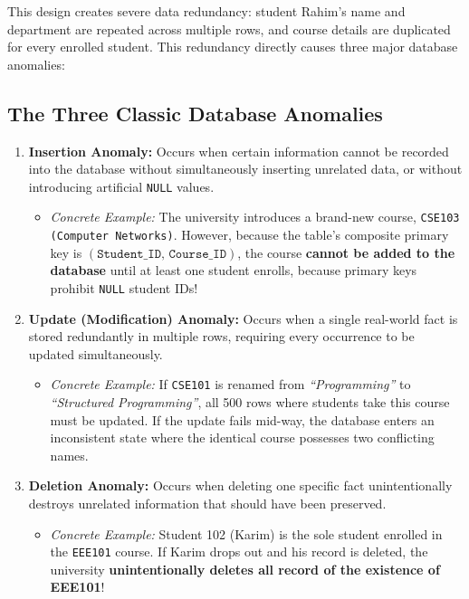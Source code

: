 This design creates severe data redundancy: student Rahim's name and department are repeated across multiple rows, and course details are duplicated for every enrolled student. This redundancy directly causes three major database anomalies:

\subsection{The Three Classic Database Anomalies}

\begin{enumerate}
\item \textbf{Insertion Anomaly:}
Occurs when certain information cannot be recorded into the database without simultaneously inserting unrelated data, or without introducing artificial \texttt{NULL} values.
\begin{itemize}
\item \textit{Concrete Example:} The university introduces a brand-new course, \texttt{CSE103 (Computer Networks)}. However, because the table's composite primary key is $(\texttt{Student\_ID, Course\_ID})$, the course \textbf{cannot be added to the database} until at least one student enrolls, because primary keys prohibit \texttt{NULL} student IDs!
\end{itemize}

\item \textbf{Update (Modification) Anomaly:}
Occurs when a single real-world fact is stored redundantly in multiple rows, requiring every occurrence to be updated simultaneously.
\begin{itemize}
\item \textit{Concrete Example:} If \texttt{CSE101} is renamed from \textit{``Programming''} to \textit{``Structured Programming''}, all 500 rows where students take this course must be updated. If the update fails mid-way, the database enters an inconsistent state where the identical course possesses two conflicting names.
\end{itemize}

\item \textbf{Deletion Anomaly:}
Occurs when deleting one specific fact unintentionally destroys unrelated information that should have been preserved.
\begin{itemize}
\item \textit{Concrete Example:} Student 102 (Karim) is the sole student enrolled in the \texttt{EEE101} course. If Karim drops out and his record is deleted, the university \textbf{unintentionally deletes all record of the existence of EEE101}!
\end{itemize}
\end{enumerate}

